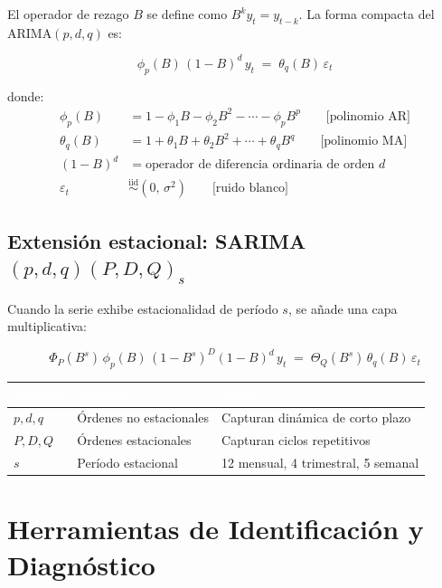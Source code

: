 \documentclass[12pt,letterpaper]{article}
\begin{document}
El operador de rezago $B$ se define como $B^k y_t = y_{t-k}$.
La forma compacta del ARIMA$(p,d,q)$ es:

\[
  \boxed{\phi_p(B)\,(1-B)^d\,y_t \;=\; \theta_q(B)\,\varepsilon_t}
\]

donde:
\begin{align*}
  \phi_p(B)   &= 1 - \phi_1 B - \phi_2 B^2 - \cdots - \phi_p B^p
                \qquad\text{[polinomio AR]} \\
  \theta_q(B) &= 1 + \theta_1 B + \theta_2 B^2 + \cdots + \theta_q B^q
                \qquad\text{[polinomio MA]} \\
  (1-B)^d     &= \text{operador de diferencia ordinaria de orden }d \\
  \varepsilon_t &\overset{\text{iid}}{\sim}(0,\,\sigma^2)\qquad\text{[ruido blanco]}
\end{align*}

\subsection{Extensión estacional: SARIMA\texorpdfstring{$(p,d,q)(P,D,Q)_s$}{}}

Cuando la serie exhibe estacionalidad de período $s$, se añade una capa multiplicativa:

\[
  \boxed{\Phi_P(B^s)\,\phi_p(B)\,(1-B^s)^D(1-B)^d\,y_t
  \;=\;
  \Theta_Q(B^s)\,\theta_q(B)\,\varepsilon_t}
\]

\begin{center}
\renewcommand{\arraystretch}{1.3}
\begin{tabular}{@{}L{1.5cm}L{3.5cm}L{5.5cm}@{}}
\toprule
{}\textcolor{white}{\textbf{Símbolo}} &
\textcolor{white}{\textbf{Nombre}} &
\textcolor{white}{\textbf{Efecto}} \\
\midrule
{}$p,d,q$ & Órdenes no estacionales & Capturan dinámica de corto plazo \\
$P,D,Q$ & Órdenes estacionales & Capturan ciclos repetitivos \\
$s$ & Período estacional & 12 mensual, 4 trimestral, 5 semanal \\
\bottomrule
\end{tabular}
\end{center}

\section{Herramientas de Identificación y Diagnóstico}
\end{document}
